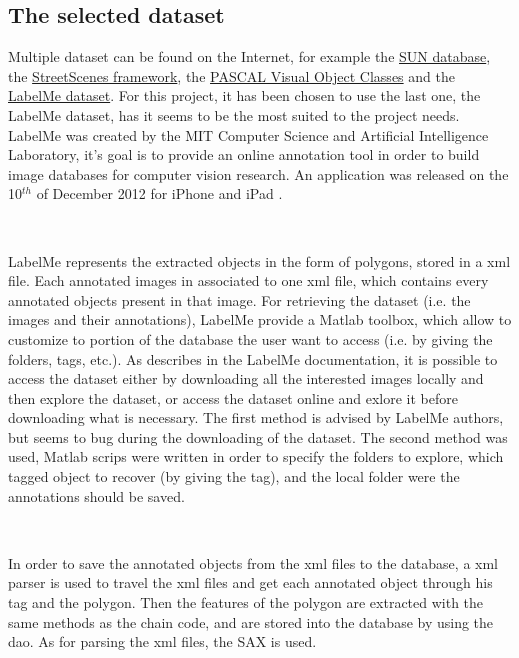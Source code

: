 \subsection{The selected dataset}

Multiple dataset can be found on the Internet, for example the \href{http://groups.csail.mit.edu/vision/SUN/}{SUN database}, the \href{http://cbcl.mit.edu/software-datasets/streetscenes/}{StreetScenes framework}, the \href{http://host.robots.ox.ac.uk/pascal/VOC/voc2007/index.html}{PASCAL Visual Object Classes} and the \href{http://labelme2.csail.mit.edu/Release3.0/browserTools/php/dataset.php}{LabelMe dataset}. For this project, it has been chosen to use the last one, the LabelMe dataset, has it seems to be the most suited to the project needs. LabelMe was created by the MIT Computer Science and Artificial Intelligence Laboratory, it's goal is to provide an online annotation tool in order to build image databases for computer vision research. An application was released on the 10$^{th}$ of December 2012 for iPhone and iPad \cite{bib:labelme}.

~~

LabelMe represents the extracted objects in the form of polygons, stored in a xml file. Each annotated images in associated to one xml file, which contains every annotated objects present in that image. For retrieving the dataset (i.e. the images and their annotations), LabelMe provide a Matlab toolbox, which allow to customize to portion of the database the user want to access (i.e. by giving the folders, tags, etc.). As describes in the LabelMe documentation, it is possible to access the dataset either by downloading all the interested images locally and then explore the dataset, or access the dataset online and exlore it before downloading what is necessary. The first method is advised by LabelMe authors, but seems to bug during the downloading of the dataset. The second method was used, Matlab scrips were written in order to specify the folders to explore, which tagged object to recover (by giving the tag), and the local folder were the annotations should be saved.

~~

In order to save the annotated objects from the xml files to the database, a xml parser is used to travel the xml files and get each annotated object through his tag and the polygon. Then the features of the polygon are extracted with the same methods as the chain code, and are stored into the database by using the dao. As for parsing the xml files, the \acrshort{SAX} is used. 

